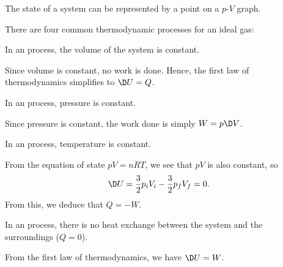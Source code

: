 The state of a system can be represented by a point on a $p$-$V$ graph.

There are four common thermodynamic processes for an ideal gas:

\begin{definition}
    In an  process, the volume of the system is constant.
\end{definition}

Since volume is constant, no work is done. Hence, the first law of thermodynamics simplifies to $\D U = Q$.

\begin{definition}
    In an  process, pressure is constant.
\end{definition}

Since pressure is constant, the work done is simply $W = p\D V$.

\begin{definition}
    In an  process, temperature is constant.
\end{definition}

From the equation of state $pV = nRT$, we see that $pV$ is also constant, so \[\D U = \frac32 p_i V_i - \frac32 p_f V_f = 0.\] From this, we deduce that $Q = -W$. 

\begin{definition}
    In an  process, there is no heat exchange between the system and the surroundings ($Q = 0$).
\end{definition}

From the first law of thermodynamics, we have $\D U = W$.

